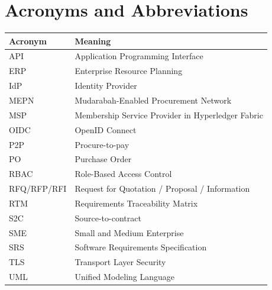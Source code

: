 \documentclass[11pt,a4paper]{article}
\begin{document}
\section{Acronyms and Abbreviations}
\begin{longtable}{@{}p{}p{}@{}}
\rowcolor{gray!18}\textbf{Acronym} & \textbf{Meaning} \\ \hline
API & Application Programming Interface \\ \hline
ERP & Enterprise Resource Planning \\ \hline
IdP & Identity Provider \\ \hline
MEPN & Mudarabah-Enabled Procurement Network \\ \hline
MSP & Membership Service Provider in Hyperledger Fabric \\ \hline
OIDC & OpenID Connect \\ \hline
P2P & Procure-to-pay \\ \hline
PO & Purchase Order \\ \hline
RBAC & Role-Based Access Control \\ \hline
RFQ/RFP/RFI & Request for Quotation / Proposal / Information \\ \hline
RTM & Requirements Traceability Matrix \\ \hline
S2C & Source-to-contract \\ \hline
SME & Small and Medium Enterprise \\ \hline
SRS & Software Requirements Specification \\ \hline
TLS & Transport Layer Security \\ \hline
UML & Unified Modeling Language \\ \hline
\end{longtable}
\end{document}
